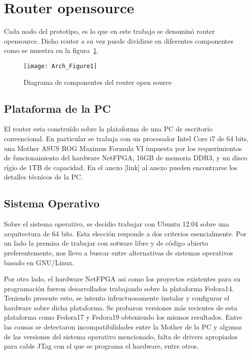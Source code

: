 \section{Router opensource}

Cada nodo del prototipo, es lo que en este trabajo se denomin\'o router opensource. Dicho router a su vez puede dividirse en diferentes componentes como se muestra en la figura~\ref{fig:OpenSourceRArch}.

\newpage
\begin{figure}[htbp!] 
\centering    
\texttt{[image: Arch\_Figure1]}
\caption[OpenSourceRArch]{Diagrama de componentes del router open source}
\label{fig:OpenSourceRArch}
\end{figure}


\subsection{Plataforma de la PC}
El router esta constru\'ido sobre la plataforma de una PC de escritorio convencional. En particular se trabaja con un procesador Intel Core i7 de 64 bits, una Mother ASUS ROG Maximus Formula VI impuesta por los requerimientos de funcionamiento del hardware NetFPGA, 16GB de memoria DDR3, y un disco r\'igio de 1TB de capacidad. En el anexo [link] al anexo pueden encontrarse los detalles t\'ecnicos de la PC.

\subsection{Sistema Operativo}
Sobre el sistema operativo, se decidio trabajar con Ubuntu 12.04 sobre una arquitectura de 64 bits. Esta elecci\'on responde a dos criterios esencialmente. Por un lado la premisa de trabajar con sotware libre y de c\'odigo abierto preferentemente, nos llevo a buscar entre alternativas de sistemas operativos basado en GNU/Linux.

Por otro lado, el hardware NetFPGA asi como los proyectos existentes para su programaci\'on fueron desarrollados trabajando sobre la plataforma Fedora14. Teniendo presente esto, se intento infructuosamente instalar y configurar el hardware sobre dicha plataforma. Se probaron versiones m\'as recientes de esta plataforma como Fedora17 y Fedora19 obteniendo los mismos resultados. Entre las causas se detectaron incompatibilidades entre la Mother de la PC y algunas de las versiones del sistema operativo mencionado, falta de drivers apropiados para cable JTag con el que se programa el hardware, entre otros.


